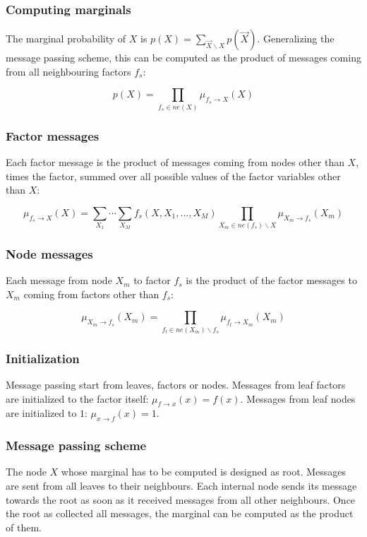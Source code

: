 		\subsubsection{Computing marginals}
    The marginal probability of $X$ is $p(X) = \sum\limits_{\vec{X}\backslash X}p(\vec{X})$.
		Generalizing the message passing scheme, this can be computed as the product of messages coming from all neighbouring factors $f_s$:

		$$p(X) = \prod\limits_{f_s\in ne(X)}\mu_{f_s\rightarrow X}(X)$$

		\subsubsection{Factor messages}
		Each factor message is the product of messages coming from nodes other than $X$, times the factor, summed over all possible values of the factor variables other than $X$:

		$$\mu_{f_s\rightarrow X}(X) = \sum\limits_{X_1}\cdots\sum\limits_{X_M}f_s(X, X_1, \dots, X_M)\prod\limits_{X_m\in ne(f_s)\backslash X}\mu_{X_m\rightarrow f_s}(X_m)$$

		\subsubsection{Node messages}
		Each message from node $X_m$ to factor $f_s$ is the product of the factor messages to $X_m$ coming from factors other than $f_s$:

		$$\mu_{X_m\rightarrow f_s}(X_m) = \prod\limits_{f_l\in ne(X_m)\backslash f_s}\mu_{f_l\rightarrow X_m}(X_m)$$

		\subsubsection{Initialization}
		Message passing start from leaves, factors or nodes.
		Messages from leaf factors are initialized to the factor itself: $\mu_{f\rightarrow x}(x) = f(x)$.
		Messages from leaf nodes are initialized to $1$: $\mu_{x\rightarrow f}(x) = 1$.

		\subsubsection{Message passing scheme}
		The node $X$ whose marginal has to be computed is designed as root.
		Messages are sent from all leaves to their neighbours.
		Each internal node sends its message towards the root as soon as it received messages from all other neighbours.
		Once the root as collected all messages, the marginal can be computed as the product of them.

